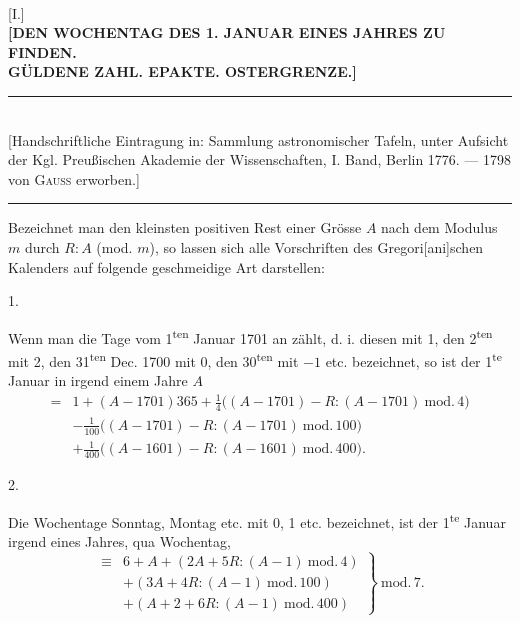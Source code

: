 \clearpage\begingroup\NoSourceHead{}
\makeatletter\tagsleft@true\let\veqno\@@leqno\makeatother
\begin{center}
{\Large{}}\\[1.5em]
{[I.]}\\[.8em]
\textbf{[DEN WOCHENTAG DES 1. JANUAR EINES JAHRES ZU FINDEN.\\
GÜLDENE ZAHL. EPAKTE. OSTERGRENZE.]}\\[.8em]
\rule{\textwidth}{.35pt}\\[.2em]
{\small [Handschriftliche Eintragung in: Sammlung astronomischer Tafeln, unter Aufsicht der Kgl. Preußischen Akademie der Wissenschaften, I. Band, Berlin 1776. — 1798 von \textsc{Gauss} erworben.]}\\[.2em]
\rule{\textwidth}{.35pt}
\end{center}
\noindent\hspace*{\parindent}Bezeichnet man den kleinsten positiven Rest einer Grösse $A$ nach dem Modulus $m$ durch $R:A$ (mod. $m$), so lassen sich alle Vorschriften des Gregori[ani]schen Kalenders auf folgende geschmeidige Art darstellen:
\begin{center}1.\end{center}
\noindent\hspace*{\parindent}Wenn man die Tage vom 1\textsuperscript{ten} Januar 1701 an zählt, d. i. diesen mit 1, den 2\textsuperscript{ten} mit 2, den 31\textsuperscript{ten} Dec. 1700 mit 0, den 30\textsuperscript{ten} mit $-1$ etc. bezeichnet, so ist der 1\textsuperscript{te} Januar in irgend einem Jahre $A$
\[
\begin{aligned}
={}&1+(A-1701)365+\frac14\bigl((A-1701)-R:(A-1701)\ \mathrm{mod.}\,4\bigr)\\
&-\frac1{100}\bigl((A-1701)-R:(A-1701)\ \mathrm{mod.}\,100\bigr)\\
&+\frac1{400}\bigl((A-1601)-R:(A-1601)\ \mathrm{mod.}\,400\bigr).
\end{aligned}
\]
\begin{center}2.\end{center}
\noindent\hspace*{\parindent}Die Wochentage Sonntag, Montag etc. mit 0, 1 etc. bezeichnet, ist der 1\textsuperscript{te} Januar irgend eines Jahres, qua Wochentag,
\clearpage{}
\[
\left.\begin{aligned}
\equiv{}&6+A+(2A+5R:(A-1)\ \mathrm{mod.}\,4)\\
&+(3A+4R:(A-1)\ \mathrm{mod.}\,100)\\
&+(A+2+6R:(A-1)\ \mathrm{mod.}\,400)
\end{aligned}\right\}\ \mathrm{mod.}\,7.
\]
